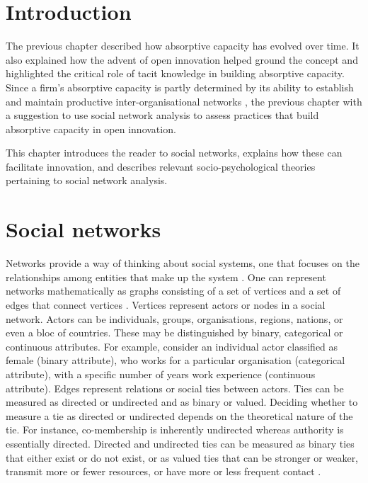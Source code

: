 
\section{Introduction}

The previous chapter described how absorptive capacity has evolved over time. It also explained how the advent of open innovation helped ground the concept and highlighted the critical role of tacit knowledge in building absorptive capacity. Since a firm's absorptive capacity is partly determined by its ability to establish and maintain productive inter-organisational networks \citep{inkpen2005social}, the previous chapter with a suggestion to use social network analysis to assess practices that build absorptive capacity in open innovation. \medskip

This chapter introduces the reader to social networks, explains how these can facilitate innovation, and describes relevant socio-psychological theories pertaining to social network analysis. \medskip

\section{Social networks}

Networks provide a way of thinking about social systems, one that focuses on the relationships among entities that make up the system \citep{borgatti2013analyzing,robins2015doing}. One can represent networks mathematically as graphs consisting of a set of vertices and a set of edges that connect vertices \citep{newman2010networks}. Vertices represent actors or nodes in a social network. Actors can be individuals, groups, organisations, regions, nations, or even a bloc of countries. These may be distinguished by binary, categorical or continuous attributes. For example, consider an individual actor classified as female (binary attribute), who works for a particular organisation (categorical attribute), with a specific number of years work experience (continuous attribute). Edges represent relations or social ties between actors. Ties can be measured as directed or undirected and as binary or valued. Deciding whether to measure a tie as directed or undirected depends on the theoretical nature of the tie. For instance, co-membership is inherently undirected whereas authority is essentially directed. Directed and undirected ties can be measured as binary ties that either exist or do not exist, or as valued ties that can be stronger or weaker, transmit more or fewer resources, or have more or less frequent contact \citep{scott2011sage}.\medskip

